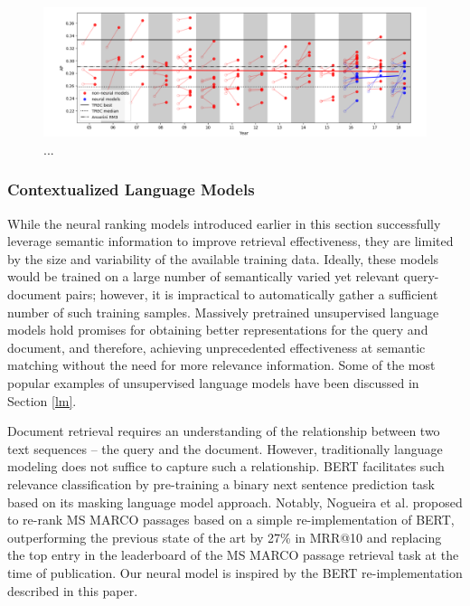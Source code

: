 \begin{figure}[b!]
\centering
  \includegraphics[width=6in]{neural_robust04.png}
\caption{...}
\label{fig:neural_robust04}
\end{figure}

\subsubsection{Contextualized Language Models}

While the neural ranking models introduced earlier in this section successfully leverage semantic information to improve retrieval effectiveness, they are limited by the size and variability of the available training data.
Ideally, these models would be trained on a large number of semantically varied yet relevant query-document pairs; however, it is impractical to automatically gather a sufficient number of such training samples.
Massively pretrained unsupervised language models hold promises for obtaining better representations for the query and document, and therefore, achieving unprecedented effectiveness at semantic matching without the need for more relevance information.
Some of the most popular examples of unsupervised language models have been discussed in Section \ref{lm}.

Document retrieval requires an understanding of the relationship between two text sequences -- the query and the document.
However, traditionally language modeling does not suffice to capture such a relationship.
BERT facilitates such relevance classification by pre-training a binary next sentence prediction task based on its masking language model approach.
Notably, Nogueira et al. \cite{nogueira2019passage} proposed to re-rank MS MARCO passages based on a simple re-implementation of BERT, outperforming the previous state of the art by 27\% in MRR@10 and replacing the top entry in the leaderboard of the MS MARCO passage retrieval task at the time of publication.
Our neural model is inspired by the BERT re-implementation described in this paper.

